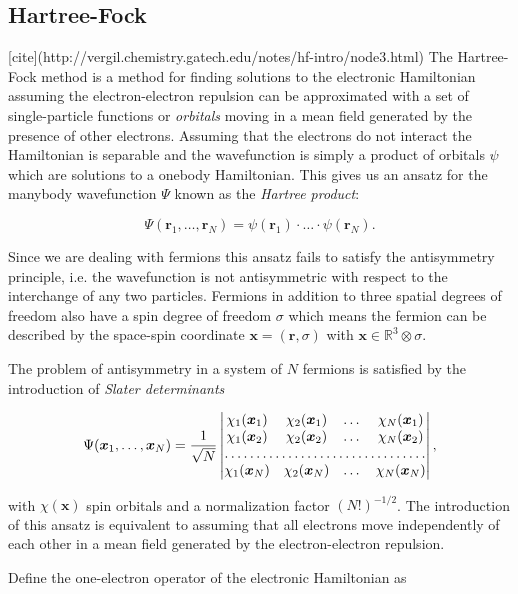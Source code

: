 \subsection{Hartree-Fock}
[cite](http://vergil.chemistry.gatech.edu/notes/hf-intro/node3.html)
The Hartree-Fock method is a method for finding
solutions to the electronic Hamiltonian assuming
the electron-electron repulsion can be approximated
with a set of single-particle functions or \textit{orbitals}
moving in a mean field generated by the presence of other electrons.
Assuming that the electrons do not interact
the Hamiltonian is separable and the wavefunction
is simply a product of orbitals $\psi$
which are solutions to a onebody Hamiltonian.
This gives us an ansatz for the manybody wavefunction $\Psi$
known as the \textit{Hartree product}:

$$ \Psi(\bm{r}_1,\dots,\bm{r}_N) = \psi(\bm{r}_1) \cdot \dots
    \cdot \psi(\bm{r}_N) . $$

Since we are dealing with fermions this ansatz fails to satisfy
the antisymmetry principle, i.e. the wavefunction
is not antisymmetric with respect to the interchange of any two
particles. Fermions in addition to three spatial degrees of freedom
also have a spin degree of freedom $\sigma$
which means the fermion can be described
by the space-spin coordinate $\bm{x} = (\bm{r}, \sigma)$
with $\bm{x} \in \mathbb{R}^3 \otimes \sigma$.
\par
The problem of antisymmetry in a system of $N$ fermions
is satisfied by the introduction of \textit{Slater determinants}

\begin{equation}
\Psi(\bm{x}_1,\dots,\bm{x}_N)
= \frac{1}{\sqrt{N}}
\begin{vmatrix}
    \chi_{1}(\bm{x}_1) & \chi_{2}(\bm{x}_1)
    & \dots & \chi_{N}(\bm{x}_1) \\
    \chi_{1}(\bm{x}_2)  & \chi_{2}(\bm{x}_2)
    & \dots & \chi_{N}(\bm{x}_2) \\
    \hdotsfor{4} \\
    \chi_{1}(\bm{x}_N) & \chi_{2}(\bm{x}_N)
    & \dots & \chi_{N}(\bm{x}_N)
\end{vmatrix} ,
\end{equation}

with $\chi(\bm{x})$ spin orbitals and a normalization factor
$(N!)^{-1/2}$. The introduction of this ansatz is equivalent to assuming that
all electrons move independently of each other
in a mean field generated by the electron-electron repulsion.
\par
Define the one-electron operator of the electronic Hamiltonian as

